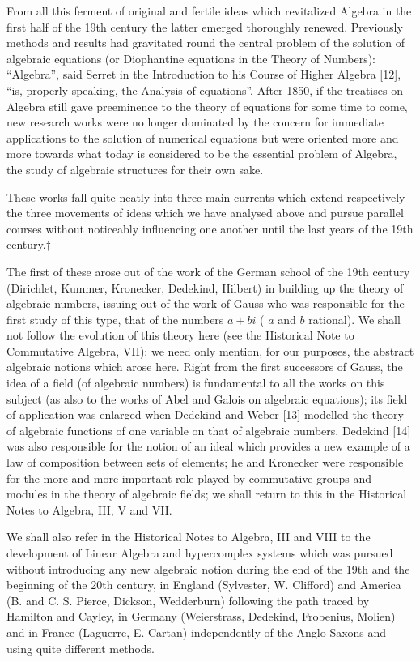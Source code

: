 From all this ferment of original and fertile ideas which revitalized Algebra in the first half of the 19th century the latter emerged thoroughly renewed. Previously methods and results had gravitated round the central problem of the solution of algebraic equations (or Diophantine equations in the Theory of Numbers): ``Algebra'', said Serret in the Introduction to his Course of Higher Algebra {[}12{]}, ``is, properly speaking, the Analysis of equations''. After 1850, if the treatises on Algebra still gave preeminence to the theory of equations for some time to come, new research works were no longer dominated by the concern for immediate applications to the solution of numerical equations but were oriented more and more towards what today is considered to be the essential problem of Algebra, the study of algebraic structures for their own sake.

These works fall quite neatly into three main currents which extend respectively the three movements of ideas which we have analysed above and pursue parallel courses without noticeably influencing one another until the last years of the 19th century.†

The first of these arose out of the work of the German school of the 19th century (Dirichlet, Kummer, Kronecker, Dedekind, Hilbert) in building up the theory of algebraic numbers, issuing out of the work of Gauss who was responsible for the first study of this type, that of the numbers \(a + bi\) ( \(a\) and \(b\) rational). We shall not follow the evolution of this theory here (see the Historical Note to Commutative Algebra, VII): we need only mention, for our purposes, the abstract algebraic notions which arose here. Right from the first successors of Gauss, the idea of a field (of algebraic numbers) is fundamental to all the works on this subject (as also to the works of Abel and Galois on algebraic equations); its field of application was enlarged when Dedekind and Weber {[}13{]} modelled the theory of algebraic functions of one variable on that of algebraic numbers. Dedekind {[}14{]} was also responsible for the notion of an ideal which provides a new example of a law of composition between sets of elements; he and Kronecker were responsible for the more and more important role played by commutative groups and modules in the theory of algebraic fields; we shall return to this in the Historical Notes to Algebra, III, V and VII.

We shall also refer in the Historical Notes to Algebra, III and VIII to the development of Linear Algebra and hypercomplex systems which was pursued without introducing any new algebraic notion during the end of the 19th and the beginning of the 20th century, in England (Sylvester, W. Clifford) and America (B. and C. S. Pierce, Dickson, Wedderburn) following the path traced by Hamilton and Cayley, in Germany (Weierstrass, Dedekind, Frobenius, Molien) and in France (Laguerre, E. Cartan) independently of the Anglo-Saxons and using quite different methods.


